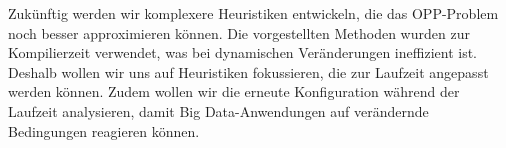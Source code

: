 \documentclass{article}
\begin{document}
Zukünftig werden wir komplexere Heuristiken entwickeln, die das OPP-Problem noch besser approximieren können. 
Die vorgestellten Methoden wurden zur Kompilierzeit verwendet, was bei dynamischen Veränderungen ineffizient ist. 
Deshalb wollen wir uns auf Heuristiken fokussieren, die zur Laufzeit angepasst werden können.
Zudem wollen wir die erneute Konfiguration während der Laufzeit analysieren, damit Big Data-Anwendungen auf verändernde Bedingungen reagieren können.

\newpage

\end{document}
